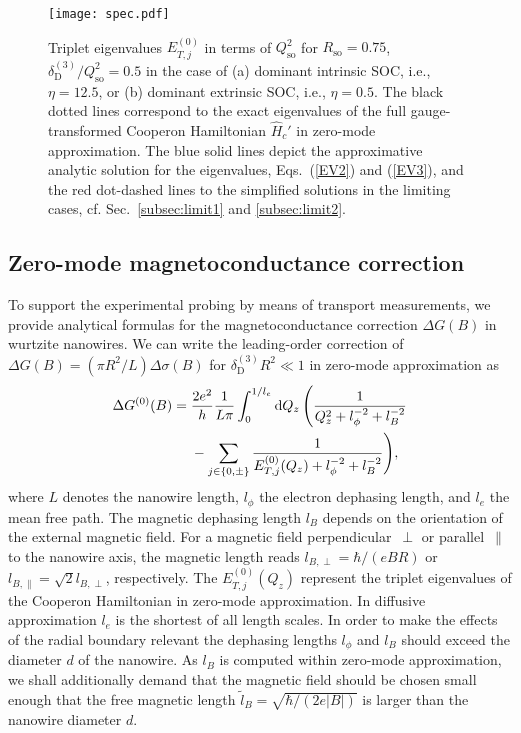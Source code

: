 \documentclass[superscriptaddress,noshowpacs,noshowkeys, twocolumn, floatfix,aps, prb,reprint]{revtex4-1}
\begin{document}
%
\begin{figure}[t]
\texttt{[image: spec.pdf]}
\caption{Triplet eigenvalues $E^{(0)}_{T,j}$ in terms of $Q_\text{so}^2$ for $R_\text{so}=0.75$, $\delta_\text{D}^{(3)}/Q_\text{so}^2=0.5$ in the case of (a) dominant intrinsic SOC, i.e., $\eta=12.5$, or (b) dominant extrinsic SOC, i.e., $\eta=0.5$. The black dotted lines correspond to the exact eigenvalues of the full gauge-transformed Cooperon Hamiltonian $\hat{H}_c'$ in zero-mode approximation. The blue solid lines depict the approximative analytic solution for the eigenvalues, Eqs.~(\ref{EV2}) and (\ref{EV3}), and the red dot-dashed lines to the simplified solutions in the limiting cases, 
cf. Sec.~\ref{subsec:limit1} and \ref{subsec:limit2}.}
\label{fig:spec}
\end{figure}



\subsection{Zero-mode magnetoconductance correction}\label{sec:mc}

To support the experimental probing by means of  transport measurements, we provide analytical formulas for the magnetoconductance correction $\Delta G(B)$ in wurtzite nanowires.
We can write the leading-order correction of $\Delta G(B)=(\pi R^2/L)\Delta \sigma(B)$ for $\delta_\text{D}^{(3)}R^2 \ll 1$ in zero-mode approximation as
%
\begin{align}
\Delta G^{(0)}(B)={}&\frac{2e^2}{h}\frac{1}{L \pi}\int_0^{1/l_e}{\rm d}Q_z\,\Bigg(\frac{1}{Q_z^2+l_\phi^{-2}+l_B^{-2}}\notag\\
&-\sum_{j\in\{0,\pm\}}\frac{1}{E_{T,j}^{(0)}(Q_z)+l_\phi^{-2}+l_B^{-2}}\Bigg),
\label{eq:MC1}
\end{align}
%
where $L$ denotes the nanowire length, $l_\phi$  the electron dephasing length, and $l_e$ the mean free path.
The magnetic dephasing length $l_B$ depends on the orientation of the external magnetic field.
For a magnetic field perpendicular~$\perp$ or parallel~$\parallel$ to the nanowire axis, the magnetic length reads $l_{B,\perp}=\hbar/(eB R)$ or  $l_{B,\parallel}=\sqrt{2}l_{B,\perp}$, respectively.\cite{Kammermeier2017}
The $E_{T,j}^{(0)}(Q_z)$ represent the triplet eigenvalues of the Cooperon Hamiltonian in zero-mode approximation.  
In diffusive approximation $l_e$ is the shortest of all length scales.
In order to make the effects of the radial boundary relevant the dephasing lengths $l_\phi$ and $l_B$ should exceed the diameter $d$ of the nanowire.
As $l_B$  is computed within zero-mode approximation, we shall additionally demand that the magnetic field should be chosen small enough that the free magnetic length $\widetilde{l}_B=\sqrt{\hbar/(2e\vert B\vert)}$ is larger than the nanowire diameter $d$.\cite{Altshuler1981,Kammermeier2017} 
\end{document}
